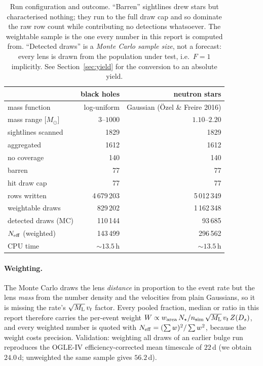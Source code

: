 \documentclass[english,10pt,a4paper]{article}
\newcommand{\Ml}{M_{\rm L}}
\newcommand{\Msun}{M_\odot}
\newcommand{\Neff}{N_{\rm eff}}
\begin{document}
\begin{table}[h]
\centering
\caption{Run configuration and outcome. ``Barren'' sightlines drew stars but characterised
nothing; they run to the full draw cap and so dominate the raw row count while contributing no
detections whatsoever. The weightable sample is the one every number in this report is computed
from. ``Detected draws'' is a \emph{Monte Carlo sample size}, not a forecast: every lens is drawn
from the population under test, i.e.\ $F=1$ implicitly. See Section~\ref{sec:yield} for the
conversion to an absolute yield.}
\label{tab:runs}
\begin{tabular}{lrr}
\toprule
 & black holes & neutron stars \\
\midrule
mass function            & log-uniform          & Gaussian (\"Ozel \& Freire 2016) \\
mass range [$\Msun$]     & $3$--$1000$          & $1.10$--$2.20$ \\
sightlines scanned       & 1829                 & 1829 \\
\quad aggregated         & 1612                 & 1612 \\
\quad no coverage        & 140                  & 140 \\
\quad barren             & 77                   & 77 \\
\quad hit draw cap       & 77                   & 77 \\
rows written             & 4\,679\,203          & 5\,012\,349 \\
weightable draws         & 829\,202             & 1\,162\,348 \\
detected draws (MC)      & 110\,144             & 93\,685 \\
$\Neff$ (weighted)       & 143\,499             & 296\,562 \\
CPU time                 & $\sim\!13.5$\,h      & $\sim\!13.5$\,h \\
\bottomrule
\end{tabular}
\end{table}

\paragraph{Weighting.} The Monte Carlo draws the lens \emph{distance} in proportion to the event
rate but the lens \emph{mass} from the number density and the velocities from plain Gaussians,
so it is missing the rate's $\sqrt{\Ml}\,v_t$ factor. Every pooled fraction, median or ratio in
this report therefore carries the per-event weight
$W \propto w_{\rm area}\,N_\star/n_{\rm sim}\,\sqrt{\Ml}\,v_t\,Z(D_s)$, and every weighted number
is quoted with $\Neff = (\sum w)^2/\sum w^2$, because the weight costs precision. Validation:
weighting all draws of an earlier bulge run reproduces the OGLE-IV efficiency-corrected mean
timescale of $22$\,d (we obtain $24.0$\,d; unweighted the same sample gives $56.2$\,d).
\end{document}
